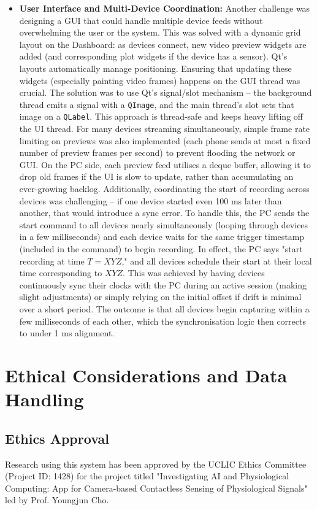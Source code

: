 \begin{itemize}
    \item \textbf{User Interface and Multi-Device Coordination:} Another challenge was designing a GUI that could handle multiple device feeds without overwhelming the user or the system. This was solved with a dynamic grid layout on the Dashboard: as devices connect, new video preview widgets are added (and corresponding plot widgets if the device has a sensor). Qt's layouts automatically manage positioning. Ensuring that updating these widgets (especially painting video frames) happens on the GUI thread was crucial. The solution was to use Qt's signal/slot mechanism -- the background thread emits a signal with a \texttt{QImage}, and the main thread's slot sets that image on a \texttt{QLabel}. This approach is thread-safe and keeps heavy lifting off the UI thread. For many devices streaming simultaneously, simple frame rate limiting on previews was also implemented (each phone sends at most a fixed number of preview frames per second) to prevent flooding the network or GUI. On the PC side, each preview feed utilises a deque buffer, allowing it to drop old frames if the UI is slow to update, rather than accumulating an ever-growing backlog. Additionally, coordinating the start of recording across devices was challenging -- if one device started even 100 ms later than another, that would introduce a sync error. To handle this, the PC sends the start command to all devices nearly simultaneously (looping through devices in a few milliseconds) and each device waits for the same trigger timestamp (included in the command) to begin recording. In effect, the PC says "start recording at time $T = XYZ$," and all devices schedule their start at their local time corresponding to $XYZ$. This was achieved by having devices continuously sync their clocks with the PC during an active session (making slight adjustments) or simply relying on the initial offset if drift is minimal over a short period. The outcome is that all devices begin capturing within a few milliseconds of each other, which the synchronisation logic then corrects to under 1 ms alignment.
\end{itemize}


\section{Ethical Considerations and Data Handling}\label{sec:4-7}

\subsection{Ethics Approval}
Research using this system has been approved by the UCLIC Ethics Committee (Project ID: 1428) for the project titled "Investigating AI and Physiological Computing: App for Camera-based Contactless Sensing of Physiological Signals" led by Prof. Youngjun Cho.

